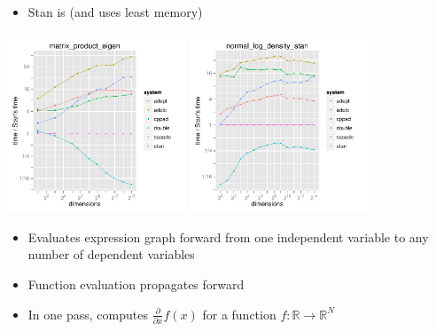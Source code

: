 \documentclass[10pt]{report}
\begin{document}
%
\vspace*{-4pt}
\begin{itemize}
\item Stan is  (and uses least memory)
\end{itemize}
\vspace*{-8pt}
\hfill \hfill
\includegraphics[width=0.4\textwidth]{img/autodiff-eval-matrix-product-eigen.pdf}
\hfill
\includegraphics[width=0.4\textwidth]{img/autodiff-eval-normal-density.pdf}
\hfill \hfill


%
\begin{itemize}
\item Evaluates expression graph forward from one independent variable
to any number of dependent variables
\item Function evaluation propagates  forward
\item In one pass, computes $\frac{\partial}{\partial x} f(x)$
for a function $f : \mathbb{R} \rightarrow \mathbb{R}^N$
\end{itemize}
\end{document}
